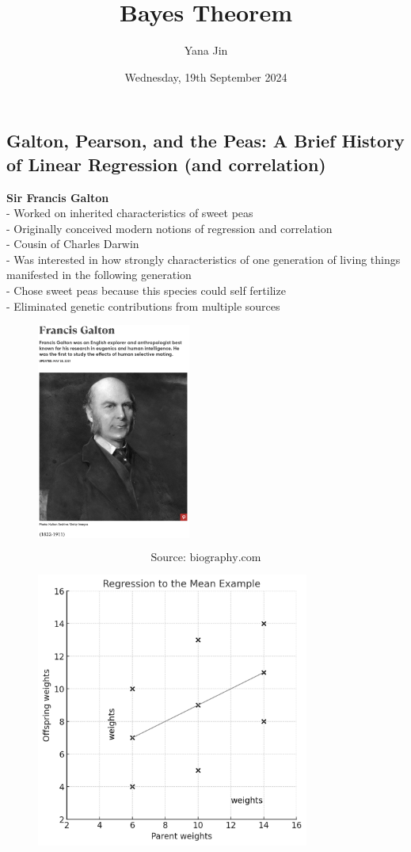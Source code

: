 \documentclass[14pt]{extarticle}
\title{Bayes Theorem}
\author{Yana Jin}
\date{Wednesday, 19th September 2024}
\begin{document}
\subsection*{Galton, Pearson, and the Peas: A Brief History of Linear Regression (and correlation)}

\noindent
\textbf{Sir Francis Galton}\\
 - Worked on inherited characteristics of sweet peas\\
 - Originally conceived modern notions of regression and correlation\\
 - Cousin of Charles Darwin\\
 - Was interested in how strongly characteristics of one generation of living things manifested in the following generation\\
 - Chose sweet peas because this species could self fertilize\\
 - Eliminated genetic contributions from multiple sources\\
\begin{figure}[H]
    \centering
    \includegraphics[width=0.45\textwidth]{fig1.png}
\end{figure}
\[\text{Source: biography.com}\]

\begin{figure}[H]
    \centering
    \includegraphics[width=0.8\textwidth]{fig2.png}
\end{figure}
\end{document}
